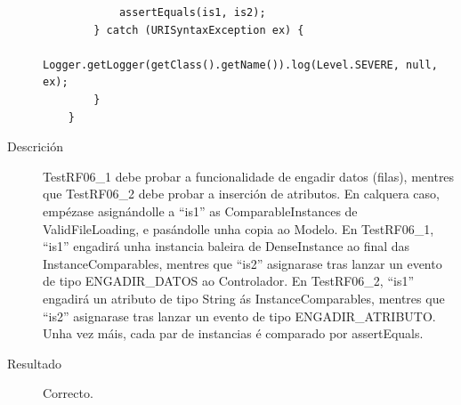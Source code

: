 \begin{description}
\begin{lstlisting}
            assertEquals(is1, is2);
        } catch (URISyntaxException ex) {
            Logger.getLogger(getClass().getName()).log(Level.SEVERE, null, ex);
        }
    }
\end{lstlisting}
\item[Descrición]
TestRF06\_1 debe probar a funcionalidade de engadir datos (filas), mentres que TestRF06\_2 debe probar a inserción de atributos. En calquera caso, empézase asignándolle a ``is1'' as ComparableInstances de ValidFileLoading, e pasándolle unha copia ao Modelo. En TestRF06\_1, ``is1'' engadirá unha instancia baleira de DenseInstance ao final das InstanceComparables, mentres que ``is2'' asignarase tras lanzar un evento de tipo ENGADIR\_DATOS ao Controlador. En TestRF06\_2, ``is1'' engadirá un atributo de tipo String ás InstanceComparables, mentres que ``is2'' asignarase tras lanzar un evento de tipo ENGADIR\_ATRIBUTO. Unha vez máis, cada par de instancias é comparado por assertEquals.
\item[Resultado]
Correcto.
\end{description}

